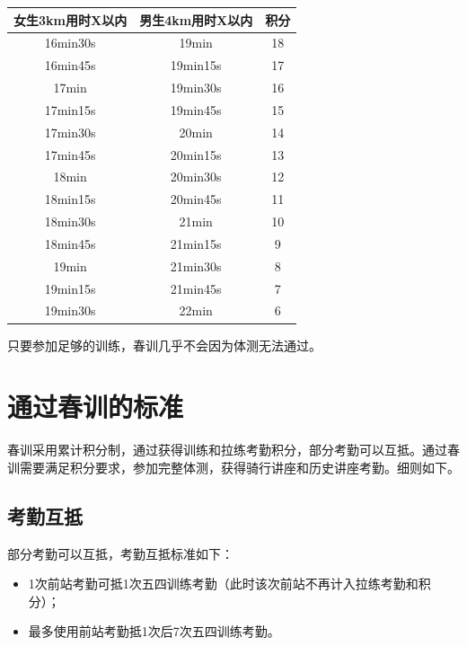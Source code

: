 \documentclass[UTF8]{ctexart}
\begin{document}
\begin{table}[h]
    \centering
    \begin{tabular}{|c|c|c|}
    \hline
    女生3km用时X以内 & 男生4km用时X以内 & 积分 \\ \hline
    16min30s   & 19min      & 18 \\ \hline
    16min45s   & 19min15s   & 17 \\ \hline
    17min      & 19min30s   & 16 \\ \hline
    17min15s   & 19min45s   & 15 \\ \hline
    17min30s   & 20min      & 14 \\ \hline
    17min45s   & 20min15s   & 13 \\ \hline
    18min      & 20min30s   & 12 \\ \hline
    18min15s   & 20min45s   & 11 \\ \hline
    18min30s   & 21min      & 10 \\ \hline
    18min45s   & 21min15s   & 9  \\ \hline
    19min      & 21min30s   & 8  \\ \hline
    19min15s   & 21min45s   & 7  \\ \hline
    19min30s   & 22min      & 6  \\ \hline
    \end{tabular}\label{test}
    \end{table}

只要参加足够的训练，春训几乎不会因为体测无法通过。 

\section{通过春训的标准}

春训采用累计积分制，通过获得训练和拉练考勤积分，部分考勤可以互抵。通过春训需要满足积分要求，参加完整体测，获得骑行讲座和历史讲座考勤。细则如下。

\subsection{考勤互抵}

部分考勤可以互抵，考勤互抵标准如下：

\begin{itemize}[nosep,left=4em]
    \item 1次前站考勤可抵1次五四训练考勤（此时该次前站不再计入拉练考勤和积分）；
    \item 最多使用前站考勤抵1次后7次五四训练考勤。 
\end{itemize}
\end{document}
